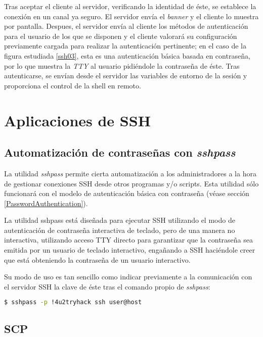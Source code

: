 \documentclass[a4paper, 11pt, titlepage]{article}
\begin{document}
        Tras aceptar el cliente al servidor, verificando la identidad de éste, se establece la conexión en un canal 
        ya seguro. El servidor envía el \textit{banner} y el cliente lo muestra por pantalla. Despues, el servidor 
        envía al cliente los métodos de autenticación para el usuario de los que se disponen y el cliente valorará 
        su configuración previamente cargada para realizar la autenticación pertinente; en el caso de la figura estudiada 
        \ref{ssh03}, esta es una autenticación básica basada en contraseña, por lo que muestra la \textit{TTY} al usuario 
        pidiéndole la contraseña de éste. Tras autenticarse, se envían desde el servidor las variables de entorno 
        de la sesión y proporciona el control de la shell en remoto.

\section{Aplicaciones de SSH}
    \subsection{Automatización de contraseñas con \textit{sshpass}}

        La utilidad \textit{sshpass} permite cierta automatización a los administradores a la hora de 
        gestionar conexiones SSH desde otros programas y/o scripts. Esta utilidad sólo funcionará con 
        el modelo de autenticación básica con contraseña (véase sección \ref{PasswordAuthentication}).

        La utilidad sshpass está diseñada para ejecutar SSH utilizando el modo de autenticación de 
        contraseña interactiva de teclado, pero de una manera no interactiva, utilizando acceso TTY 
        directo para garantizar que la contraseña sea emitida por un usuario de teclado interactivo, 
        engañando a SSH haciéndole creer que está obteniendo la contraseña de un usuario interactivo.

        Su modo de uso es tan sencillo como indicar previamente a la comunicación con el servidor SSH 
        la clave de éste tras el comando propio de \textit{sshpass}:

        \begin{lstlisting}[language=bash,basicstyle=\footnotesize]
    $ sshpass -p !4u2tryhack ssh user@host\end{lstlisting}

    \subsection{SCP}
\end{document}
